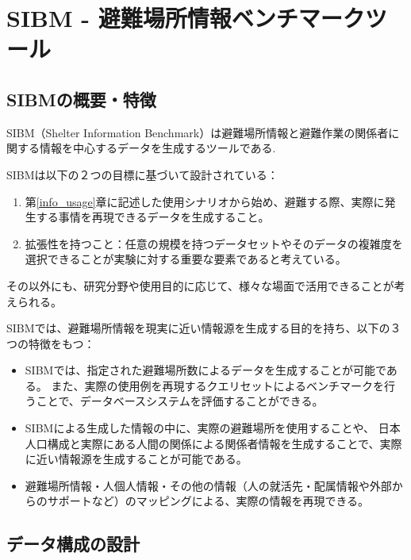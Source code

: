 ﻿%
\chapter{SIBM - 避難場所情報ベンチマークツール}
\label{sibm_exp}

\section{SIBMの概要・特徴}
\label{sibm:definition}

SIBM（Shelter Information Benchmark）は避難場所情報と避難作業の関係者に関する情報を中心するデータを生成するツールである.

SIBMは以下の２つの目標に基づいて設計されている：

\begin{enumerate}
  \item
  第\ref{info_usage}章に記述した使用シナリオから始め、避難する際、実際に発生する事情を再現できるデータを生成すること。
  \item 拡張性を持つこと：任意の規模を持つデータセットやそのデータの複雑度を選択できることが実験に対する重要な要素であると考えている。
\end{enumerate}

その以外にも、研究分野や使用目的に応じて、様々な場面で活用できることが考えられる。

SIBMでは、避難場所情報を現実に近い情報源を生成する目的を持ち、以下の３つの特徴をもつ：

\begin{itemize}
	\item SIBMでは、指定された避難場所数によるデータを生成することが可能である。
	また、実際の使用例を再現するクエリセットによるベンチマークを行うことで、データベースシステムを評価することができる。
	\item SIBMによる生成した情報の中に、実際の避難場所を使用することや、
	日本人口構成と実際にある人間の関係による関係者情報を生成することで、実際に近い情報源を生成することが可能である。
	\item 避難場所情報・人個人情報・その他の情報（人の就活先・配属情報や外部からのサポートなど）のマッピングによる、実際の情報を再現できる。
\end{itemize}

\section{データ構成の設計}
\label{sibm:data_structure}

